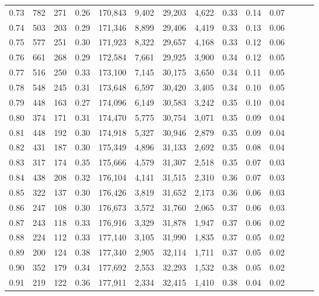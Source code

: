 \begin{tabular}{rrrrrrrrrrrrrr}
0.73 &    782 &  271 &  0.26 &  170,843 &    9,402 &  29,203 &   4,622 &  0.33 &  0.14 &      0.07 \\
0.74 &    503 &  203 &  0.29 &  171,346 &    8,899 &  29,406 &   4,419 &  0.33 &  0.13 &      0.06 \\
0.75 &    577 &  251 &  0.30 &  171,923 &    8,322 &  29,657 &   4,168 &  0.33 &  0.12 &      0.06 \\
0.76 &    661 &  268 &  0.29 &  172,584 &    7,661 &  29,925 &   3,900 &  0.34 &  0.12 &      0.05 \\
0.77 &    516 &  250 &  0.33 &  173,100 &    7,145 &  30,175 &   3,650 &  0.34 &  0.11 &      0.05 \\
0.78 &    548 &  245 &  0.31 &  173,648 &    6,597 &  30,420 &   3,405 &  0.34 &  0.10 &      0.05 \\
0.79 &    448 &  163 &  0.27 &  174,096 &    6,149 &  30,583 &   3,242 &  0.35 &  0.10 &      0.04 \\
0.80 &    374 &  171 &  0.31 &  174,470 &    5,775 &  30,754 &   3,071 &  0.35 &  0.09 &      0.04 \\
0.81 &    448 &  192 &  0.30 &  174,918 &    5,327 &  30,946 &   2,879 &  0.35 &  0.09 &      0.04 \\
0.82 &    431 &  187 &  0.30 &  175,349 &    4,896 &  31,133 &   2,692 &  0.35 &  0.08 &      0.04 \\
0.83 &    317 &  174 &  0.35 &  175,666 &    4,579 &  31,307 &   2,518 &  0.35 &  0.07 &      0.03 \\
0.84 &    438 &  208 &  0.32 &  176,104 &    4,141 &  31,515 &   2,310 &  0.36 &  0.07 &      0.03 \\
0.85 &    322 &  137 &  0.30 &  176,426 &    3,819 &  31,652 &   2,173 &  0.36 &  0.06 &      0.03 \\
0.86 &    247 &  108 &  0.30 &  176,673 &    3,572 &  31,760 &   2,065 &  0.37 &  0.06 &      0.03 \\
0.87 &    243 &  118 &  0.33 &  176,916 &    3,329 &  31,878 &   1,947 &  0.37 &  0.06 &      0.02 \\
0.88 &    224 &  112 &  0.33 &  177,140 &    3,105 &  31,990 &   1,835 &  0.37 &  0.05 &      0.02 \\
0.89 &    200 &  124 &  0.38 &  177,340 &    2,905 &  32,114 &   1,711 &  0.37 &  0.05 &      0.02 \\
0.90 &    352 &  179 &  0.34 &  177,692 &    2,553 &  32,293 &   1,532 &  0.38 &  0.05 &      0.02 \\
0.91 &    219 &  122 &  0.36 &  177,911 &    2,334 &  32,415 &   1,410 &  0.38 &  0.04 &      0.02 \\

\end{tabular}
